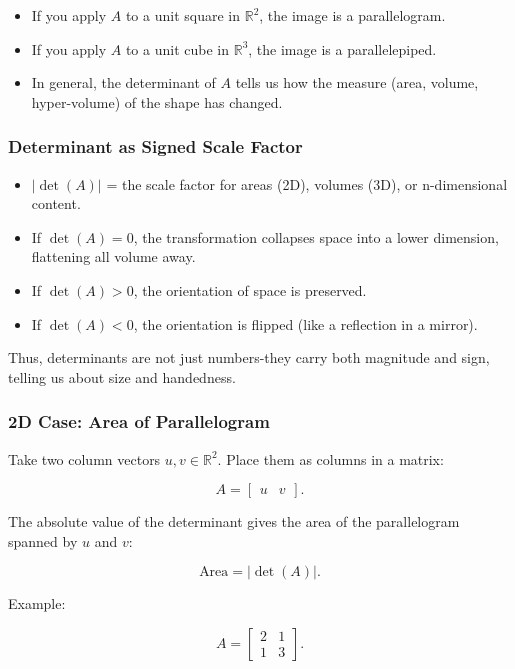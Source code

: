 \documentclass[
  letterpaper,
  DIV=11,
  numbers=noendperiod]{scrreprt}
\providecommand{\tightlist}{%
  \setlength{\itemsep}{0pt}\setlength{\parskip}{0pt}}
\begin{document}
\begin{itemize}
\tightlist
\item
  If you apply \(A\) to a unit square in \(\mathbb{R}^2\), the image is
  a parallelogram.
\item
  If you apply \(A\) to a unit cube in \(\mathbb{R}^3\), the image is a
  parallelepiped.
\item
  In general, the determinant of \(A\) tells us how the measure (area,
  volume, hyper-volume) of the shape has changed.
\end{itemize}

\subsubsection{Determinant as Signed Scale
Factor}\label{determinant-as-signed-scale-factor}

\begin{itemize}
\tightlist
\item
  \(|\det(A)|\) = the scale factor for areas (2D), volumes (3D), or
  n-dimensional content.
\item
  If \(\det(A) = 0\), the transformation collapses space into a lower
  dimension, flattening all volume away.
\item
  If \(\det(A) > 0\), the orientation of space is preserved.
\item
  If \(\det(A) < 0\), the orientation is flipped (like a reflection in a
  mirror).
\end{itemize}

Thus, determinants are not just numbers-they carry both magnitude and
sign, telling us about size and handedness.

\subsubsection{2D Case: Area of
Parallelogram}\label{d-case-area-of-parallelogram}

Take two column vectors \(u,v \in \mathbb{R}^2\). Place them as columns
in a matrix:

\[
A = \begin{bmatrix} u & v \end{bmatrix}.
\]

The absolute value of the determinant gives the area of the
parallelogram spanned by \(u\) and \(v\):

\[
\text{Area} = |\det(A)|.
\]

Example:

\[
A = \begin{bmatrix} 2 & 1 \\ 1 & 3 \end{bmatrix}.
\]
\end{document}
